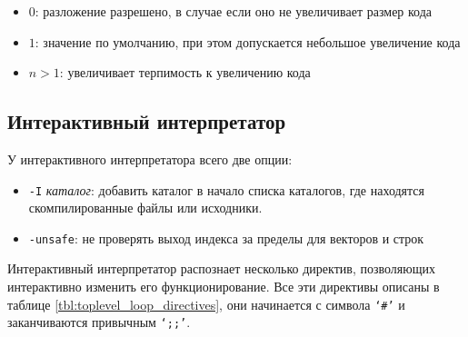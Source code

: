 \begin{itemize}
	\item $0$: разложение разрешено, в случае если оно не увеличивает размер
кода
	\item $1$: значение по умолчанию, при этом допускается небольшое увеличение
кода
	\item $n > 1$: увеличивает терпимость к увеличению кода 
\end{itemize}

\subsection{Интерактивный интерпретатор}

У интерактивного интерпретатора всего две опции:

\begin{itemize}
	\item \texttt{-I} {\it каталог}: добавить каталог в начало списка каталогов,
где находятся
скомпилированные файлы или исходники.
	\item \texttt{-unsafe}: не проверять выход индекса за пределы для векторов и
строк
\end{itemize}

Интерактивный интерпретатор распознает несколько директив, позволяющих
интерактивно изменить его функционирование. Все эти директивы описаны в таблице
\ref{tbl:toplevel_loop_directives}, они начинается с символа \texttt{`\#'} и
заканчиваются привычным \texttt{`;;'}.


